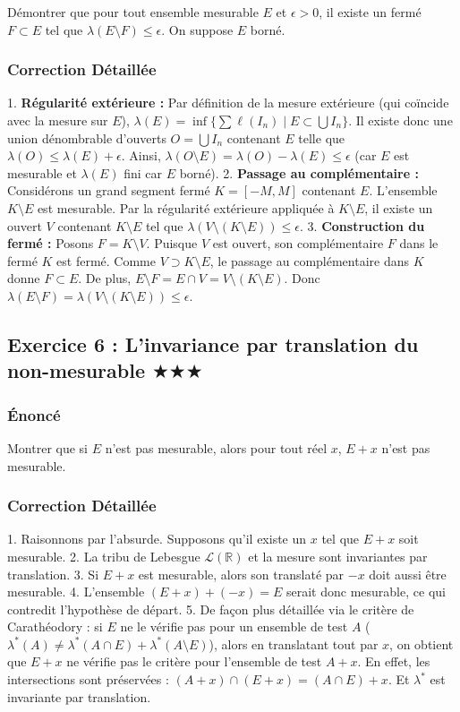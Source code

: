\documentclass[11pt,a4paper]{article}
\begin{document}
Démontrer que pour tout ensemble mesurable $E$ et $\epsilon > 0$, il existe un fermé $F \subset E$ tel que $\lambda(E \setminus F) \le \epsilon$. On suppose $E$ borné.

\subsubsection*{Correction Détaillée}

1. \textbf{Régularité extérieure :} Par définition de la mesure extérieure (qui coïncide avec la mesure sur $E$), $\lambda(E) = \inf \{ \sum \ell(I_n) \mid E \subset \bigcup I_n \}$.
Il existe donc une union dénombrable d'ouverts $O = \bigcup I_n$ contenant $E$ telle que $\lambda(O) \le \lambda(E) + \epsilon$.
Ainsi, $\lambda(O \setminus E) = \lambda(O) - \lambda(E) \le \epsilon$ (car $E$ est mesurable et $\lambda(E)$ fini car $E$ borné).
2. \textbf{Passage au complémentaire :} Considérons un grand segment fermé $K = [-M, M]$ contenant $E$. L'ensemble $K \setminus E$ est mesurable.
Par la régularité extérieure appliquée à $K \setminus E$, il existe un ouvert $V$ contenant $K \setminus E$ tel que $\lambda(V \setminus (K \setminus E)) \le \epsilon$.
3. \textbf{Construction du fermé :} Posons $F = K \setminus V$.
Puisque $V$ est ouvert, son complémentaire $F$ dans le fermé $K$ est fermé.
Comme $V \supset K \setminus E$, le passage au complémentaire dans $K$ donne $F \subset E$.
De plus, $E \setminus F = E \cap V = V \setminus (K \setminus E)$.
Donc $\lambda(E \setminus F) = \lambda(V \setminus (K \setminus E)) \le \epsilon$.


\subsection*{Exercice 6 : L'invariance par translation du non-mesurable \quad $\displaystyle \bigstar\bigstar\bigstar$}


\subsubsection*{Énoncé}

Montrer que si $E$ n'est pas mesurable, alors pour tout réel $x$, $E+x$ n'est pas mesurable.

\subsubsection*{Correction Détaillée}

1. Raisonnons par l'absurde. Supposons qu'il existe un $x$ tel que $E+x$ soit mesurable.
2. La tribu de Lebesgue $\mathcal{L}(\mathbb{R})$ et la mesure sont invariantes par translation.
3. Si $E+x$ est mesurable, alors son translaté par $-x$ doit aussi être mesurable.
4. L'ensemble $(E+x) + (-x) = E$ serait donc mesurable, ce qui contredit l'hypothèse de départ.
5. De façon plus détaillée via le critère de Carathéodory : si $E$ ne le vérifie pas pour un ensemble de test $A$ ($\lambda^*(A) \neq \lambda^*(A \cap E) + \lambda^*(A \setminus E)$), alors en translatant tout par $x$, on obtient que $E+x$ ne vérifie pas le critère pour l'ensemble de test $A+x$. En effet, les intersections sont préservées : $(A+x) \cap (E+x) = (A \cap E) + x$. Et $\lambda^*$ est invariante par translation.
\end{document}
